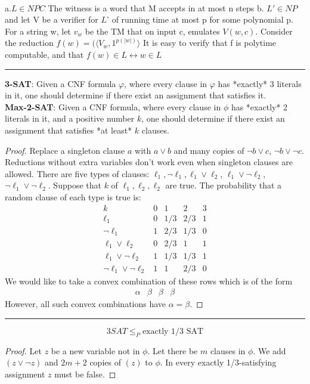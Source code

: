\documentclass[10pt,landscape]{article}
\theoremstyle{plain}%
\theoremstyle{definition}
\theoremstyle{remark}
\begin{document}
\begin{multicols}{3}
\\
a.$L\in NPC$
The witness is a word that M accepts in at most n steps
b. $L'\in NP$ and let V be a verifier for $L’$ of running time at most p
for some polynomial p. For a string w, let $v_w$ be the TM that on input
c, emulates $V(w,c)$.
Consider the reduction $f(w)=(\langle V_w,1^{p(|w|)}\rangle$
It is easy to verify that f is polytime computable, and that $f(w) \in L \leftrightarrow w\in L$
\hrule
\begin{center}
\textbf{3-SAT}: Given a CNF formula $\varphi$, where every clause in $\varphi$ has *exactly* 3 literals in it, one should determine if there exist an assignment that satisfies it.  
\\\textbf{Max-2-SAT}: Given a CNF formula, where every clause in $\phi$ has *exactly* 2 literals in it, and a positive number $k$, one should determine if there exist an assignment that satisfies *at least* $k$ clauses.
\end{center}
\begin{proof}
Replace a singleton clause $a$ with $a \lor b$ and many copies of $\lnot b \lor c$, $\lnot b \lor \lnot c$.
Reductions without extra variables don't work even when singleton clauses are allowed. There are five types of clauses: $\ell_1,\lnot \ell_1, \ell_1 \lor \ell_2$, $\ell_1 \lor \lnot \ell_2$, $\lnot \ell_1 \lor \lnot \ell_2$. Suppose that $k$ of $\ell_1,\ell_2,\ell_2$ are true. The probability that a random clause of each type is true is:
$$
\begin{array}{c|cccc}
k&0&1&2&3\\\hline
\ell_1 & 0 & 1/3 & 2/3 & 1 \\
\lnot \ell_1 & 1 & 2/3 & 1/3 & 0 \\
\ell_1 \lor \ell_2 & 0 & 2/3 & 1 & 1\\
\ell_1 \lor \lnot \ell_2 & 1 & 1/3 & 1/3 & 1\\
\lnot \ell_1 \lor \lnot \ell_2 & 1 & 1 & 2/3 & 0
\end{array}
$$
We would like to take a convex combination of these rows which is of the form
$$ \begin{array}{cccc} \alpha & \beta & \beta & \beta \end{array} $$
However, all such convex combinations have $\alpha = \beta$.\end{proof}\hrule
\[3SAT\le_P \text{exactly 1/3 SAT}
\]
\begin{proof}
Let $z$ be a new variable not in $\phi$. Let there be $m$ clauses in $\phi$. We add $(z \lor \lnot z)$ and $2m+2$ copies of $(z)$ to $\phi$. In every exactly 1/3-satisfying assignment $z$ must be false.


\end{proof}
\end{multicols}
\end{document}
